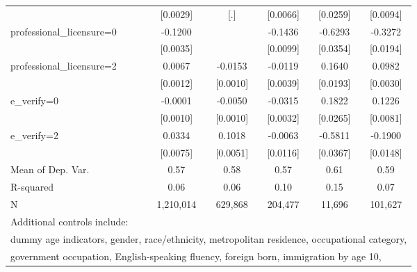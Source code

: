 \begin{table}[htbp]
\begin{tabular}{l*{5}{c}}
                    &    [0.0029]         &         [.]         &    [0.0066]         &    [0.0259]         &    [0.0094]         \\
\addlinespace
professional\_licensure=0&     -0.1200\sym{***}&                     &     -0.1436\sym{***}&     -0.6293\sym{***}&     -0.3272\sym{***}\\
                    &    [0.0035]         &                     &    [0.0099]         &    [0.0354]         &    [0.0194]         \\
\addlinespace
professional\_licensure=2&      0.0067\sym{***}&     -0.0153\sym{***}&     -0.0119\sym{***}&      0.1640\sym{***}&      0.0982\sym{***}\\
                    &    [0.0012]         &    [0.0010]         &    [0.0039]         &    [0.0193]         &    [0.0030]         \\
\addlinespace
e\_verify=0          &     -0.0001         &     -0.0050\sym{***}&     -0.0315\sym{***}&      0.1822\sym{***}&      0.1226\sym{***}\\
                    &    [0.0010]         &    [0.0010]         &    [0.0032]         &    [0.0265]         &    [0.0081]         \\
\addlinespace
e\_verify=2          &      0.0334\sym{***}&      0.1018\sym{***}&     -0.0063         &     -0.5811\sym{***}&     -0.1900\sym{***}\\
                    &    [0.0075]         &    [0.0051]         &    [0.0116]         &    [0.0367]         &    [0.0148]         \\
\midrule
Mean of Dep. Var.   &        0.57         &        0.58         &        0.57         &        0.61         &        0.59         \\
R-squared           &        0.06         &        0.06         &        0.10         &        0.15         &        0.07         \\
N                   &   1,210,014         &     629,868         &     204,477         &      11,696         &     101,627         \\
\bottomrule
\multicolumn{6}{l}{\footnotesize Additional controls include:}\\
\multicolumn{6}{l}{\footnotesize dummy age indicators, gender, race/ethnicity, metropolitan residence, occupational category,}\\
\multicolumn{6}{l}{\footnotesize government occupation, English-speaking fluency, foreign born, immigration by age 10,}\\

\end{tabular}
\end{table}
